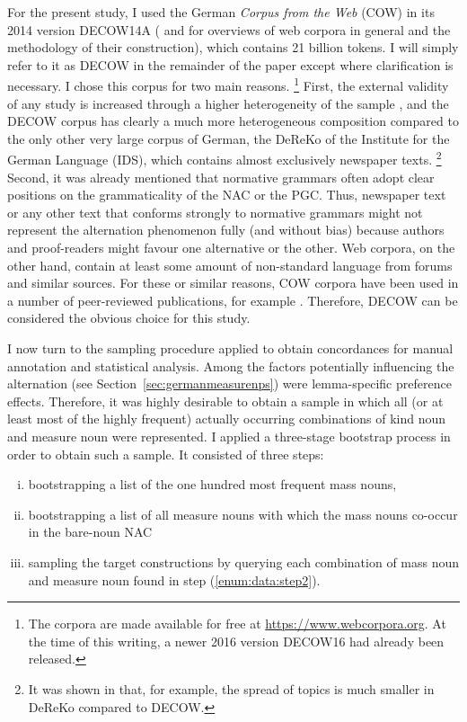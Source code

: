 \documentclass[USenglish]{article}
\begin{document}
For the present study, I used the German \textit{Corpus from the Web} (COW) in its 2014 version DECOW14A (\citealp{SchaeferBildhauer2012full,Schaefer2015b} and \citealp{BiemannEa2013,SchaeferBildhauer2013} for overviews of web corpora in general and the methodology of their construction), which contains 21 billion tokens.
I will simply refer to it as DECOW in the remainder of the paper except where clarification is necessary.
I chose this corpus for two main reasons.%
\footnote{The corpora are made available for free at \url{https://www.webcorpora.org}.
At the time of this writing, a newer 2016 version DECOW16 had already been released.}
First, the external validity of any study is increased through a higher heterogeneity of the sample \citep[30]{MaxwellDelaney2004}, and the DECOW corpus has clearly a much more heterogeneous composition compared to the only other very large corpus of German, the DeReKo \citep{KupietzEa2010} of the Institute for the German Language (IDS), which contains almost exclusively newspaper texts.%
\footnote{It was shown in \cite{W16-2601} that, for example, the spread of topics is much smaller in DeReKo compared to DECOW.}
Second, it was already mentioned that normative grammars often adopt clear positions on the grammaticality of the NAC or the PGC.
Thus, newspaper text or any other text that conforms strongly to normative grammars might not represent the alternation phenomenon fully (and without bias) because authors and proof-readers might favour one alternative or the other.
Web corpora, on the other hand, contain at least some amount of non-standard language from forums and similar sources.
For these or similar reasons, COW corpora have been used in a number of peer-reviewed publications, for example \cite{VanGoethemHiligsmann2014,VanGoethemHuening2015,MuellerS2014,Schaefer2016c,SchaeferSayatz2014,SchaeferSayatz2016,Zimmer2015}. 
Therefore, DECOW can be considered the obvious choice for this study.

I now turn to the sampling procedure applied to obtain concordances for manual annotation and statistical analysis.
Among the factors potentially influencing the alternation (see Section~\ref{sec:germanmeasurenps}) were lemma-specific preference effects.
Therefore, it was highly desirable to obtain a sample in which all (or at least most of the highly frequent) actually occurring combinations of kind noun and measure noun were represented.
I applied a three-stage bootstrap process in order to obtain such a sample.
It consisted of three steps:

\begin{enumerate}[i.]
  \item\label{enum:data:step1} bootstrapping a list of the one hundred most frequent mass nouns,
  \item\label{enum:data:step2} bootstrapping a list of all measure nouns with which the mass nouns co-occur in the bare-noun NAC 
  \item\label{enum:data:step3} sampling the target constructions by querying each combination of mass noun and measure noun found in step (\ref{enum:data:step2}).
\end{enumerate}
\end{document}
